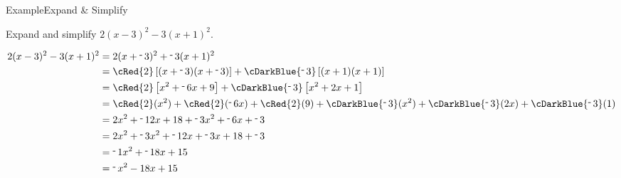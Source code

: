 \documentclass[aspectratio=169, sectionpages]{beamer}
\begin{document}
\begin{frame}{Example}{Expand \& Simplify}

	\prob Expand and simplify \( 2(x - 3)^2 - 3(x + 1)^2 \).


	\framebreak
	\soln \hfill
	\begin{align*}
		2(x - 3)^2 - 3(x + 1)^2 & = 2(x + \oneg  3)^2 + \oneg  3(x + 1)^2                                                                                              \\
		                        & = \cRed{2}\sqpar{(x + \oneg 3)(x + \oneg 3)} + \cDarkBlue{ \oneg 3}\sqpar{(x + 1)(x + 1)}                                            \\
		                        & = \cRed{2}\sqpar{x^2 + \oneg 6x + 9} + \cDarkBlue{ \oneg 3} \sqpar{x^2 + 2x + 1}                                                     \\
		                        & = \cRed{2}(x^2) + \cRed{2}( \oneg 6x) + \cRed{2}(9) + \cDarkBlue{ \oneg 3}(x^2) + \cDarkBlue{ \oneg 3}(2x) + \cDarkBlue{ \oneg 3}(1) \\
		                        & = 2x^2 + \oneg 12x + 18 + \oneg 3x^2 + \oneg 6x + \oneg 3                                                                            \\
		                        & = 2x^2 + \oneg 3x^2 + \oneg 12x + \oneg 3x + 18 + \oneg 3                                                                            \\
		                        & = \oneg 1x^2 + \oneg 18x + 15                                                                                                        \\
		                        & = \oneg x^2 - 18x + 15
	\end{align*}
\end{frame}
\end{document}
